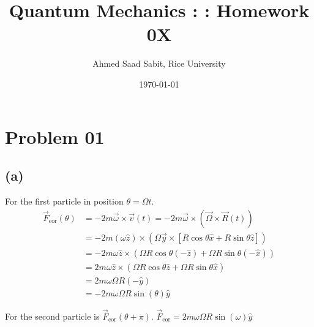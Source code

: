 \documentclass[letter, 10pts]{article}
\title{Quantum Mechanics : : Homework 0X}
\author{Ahmed Saad Sabit, Rice University}
\date{\today}
\begin{document}
\maketitle






























\section*{Problem 01} 
\subsection*{(a)} 
For the first particle in position $\theta = \Omega t$. 
\begin{align*}
\vec{F}_\text{cor} (\theta) &= - 2m \vec{\omega} \times \vec{v}(t) = - 2m \vec{\omega} \times  (\vec{\Omega} \times \vec{R}(t) )\\
&=
- 2 m (\omega \hat{z}) \times  
\left(
\Omega \vec{y} \times 
\left[
R \cos \theta \hat{x} + R \sin \theta \hat{z}
\right]
\right)
\\
&= 
- 2m \omega \hat{z} \times \left(
\Omega R \cos \theta(- \hat{z}) + \Omega R \sin  \theta (- \hat{x})
\right)
\\
&= 
2m \omega \hat{z} \times \left(
\Omega R \cos \theta\hat{z} + \Omega R \sin  \theta  \hat{x}
\right)
\\
&= 
2 m \omega \Omega R (- \hat{y})
\\
&= 
- 2 m \omega \Omega R \sin (\theta)\hat{y}
\end{align*}

For the second particle is $\vec{F}_\text{cor}(\theta + \pi )$.  $\vec{F}_\text{cor} = 2 m \omega \Omega R \sin(\omega) \hat{y}$
\end{document}
